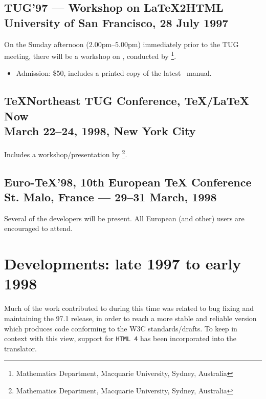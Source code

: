 \vfil

\subsection*[center]{TUG'97 --- Workshop on \LaTeX2HTML\\
University of San Francisco, 28 July 1997\label{tug97}}

\noindent
On the Sunday afternoon (2.00pm--5.00pm)
immediately prior to the TUG meeting, there will be a workshop
on \latextohtml, conducted by \RossMoore\footnote{%
Mathematics Department, Macquarie University, Sydney, Australia}.

\begin{itemize}
\item[]
Admission: \$50, includes a printed copy of the latest \latextohtml\ manual.
\end{itemize}

\bigskip

\subsection*[center]{\TeX{}Northeast TUG Conference, \TeX/\LaTeX{} Now\\
March 22--24, 1998, New York City}

\noindent
Includes a workshop/presentation by \RossMoore\footnote{%
Mathematics Department, Macquarie University, Sydney, Australia}.


\subsection*[center]{Euro-\TeX{}'98, 10th European \TeX{} Conference\\
St. Malo, France --- 29--31 March, 1998}

\noindent
Several of the \latextohtml{} developers will be present.
All European (and other) \latextohtml{} users are encouraged to attend.


\vfil


\clearpage
\section*{Developments: late 1997 to early 1998\label{recent98}}%
Much of the work contributed to \latextohtml{} during this time was
related to bug fixing and maintaining the 97.1 release, in order to
reach a more stable and reliable version which produces  code
conforming to the W3C standards/drafts.
To keep in context with this view, support for \texttt{HTML 4} has been
incorporated into the translator.

